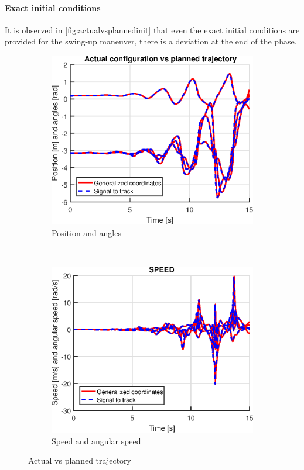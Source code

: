 \documentclass[a4paper,12pt]{article}
\begin{document}
\paragraph{Exact initial conditions}
It is observed in \autoref{fig:actualvsplannedinit} that even the exact initial conditions are provided for the swing-up maneuver, there is a deviation at the end of the phase.
\begin{figure}[H]
    \centering
    \begin{subfigure}[h]{0.48\textwidth}
        \centering
        \includegraphics[width=1\textwidth]{illustrations/graph_swingup_pos_init.eps}
        \caption{Position and angles}
    \end{subfigure}%
    ~ 
    \begin{subfigure}[h]{0.48\textwidth}
        \centering
        \includegraphics[width=1\textwidth]{illustrations/graph_swingup_speed_init.eps}
        \caption{Speed and angular speed}
    \end{subfigure}
    \caption{Actual vs planned trajectory}
    \label{fig:actualvsplannedinit}
\end{figure}
\end{document}
